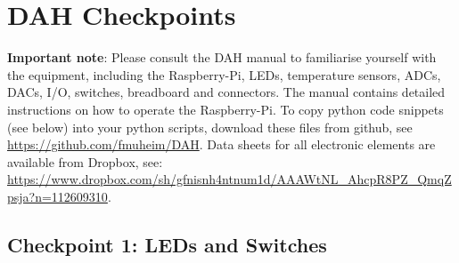 \chapter{DAH Checkpoints}
\label{sec:checkpoints}
\vspace*{-0.99cm}
{\bf Important note}: Please consult the DAH manual to familiarise yourself with the equipment, including the Raspberry-Pi, LEDs, temperature sensors, ADCs, DACs, I/O, switches, breadboard and connectors.
The manual contains detailed instructions on how to operate the Raspberry-Pi.
To copy python code snippets (see below) into your python scripts, download these files from github, see \url{https://github.com/fmuheim/DAH}.
Data sheets for all electronic elements are available from Dropbox, see: \url{https://www.dropbox.com/sh/gfnisnh4ntnum1d/AAAWtNL_AhcpR8PZ_QmqZpsja?n=112609310}.  

\section{Checkpoint 1: LEDs and Switches}

